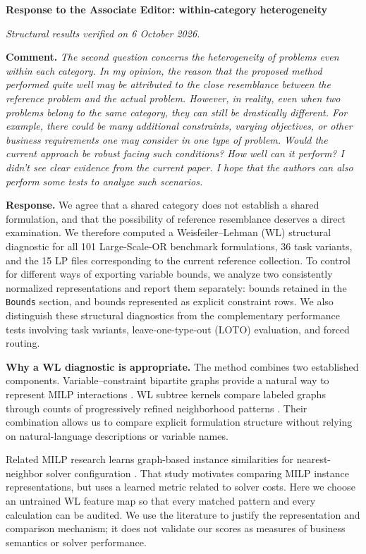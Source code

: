 \documentclass[10pt]{article}
\begin{document}
\textbf{\large Response to the Associate Editor: within-category heterogeneity}

\textit{Structural results verified on 6 October 2026.}

\textbf{Comment.} \textit{The second question concerns the heterogeneity of
problems even within each category. In my opinion, the reason that the
proposed method performed quite well may be attributed to the close
resemblance between the reference problem and the actual problem. However,
in reality, even when two problems belong to the same category, they can
still be drastically different. For example, there could be many additional
constraints, varying objectives, or other business requirements one may
consider in one type of problem. Would the current approach be robust
facing such conditions? How well can it perform? I didn't see clear evidence
from the current paper. I hope that the authors can also perform some tests
to analyze such scenarios.}

\begingroup\color{replyblue}
\textbf{Response.} We agree that a shared category does not establish a shared
formulation, and that the possibility of reference resemblance deserves a
direct examination. We therefore computed a Weisfeiler--Lehman (WL)
structural diagnostic for all 101 Large-Scale-OR benchmark formulations,
36 task variants, and the 15 LP files corresponding to the current
reference collection. To control for different ways of exporting variable
bounds, we analyze two consistently normalized representations and report
them separately: bounds retained in the \texttt{Bounds} section, and bounds
represented as explicit constraint rows. We also distinguish these
structural diagnostics from the complementary performance tests involving
task variants, leave-one-type-out (LOTO) evaluation, and forced routing.

\medskip
\textbf{Why a WL diagnostic is appropriate.}
The method combines two established components. Variable--constraint
bipartite graphs provide a natural way to represent MILP interactions
\citep{Gasse2019}. WL subtree kernels compare labeled graphs through
counts of progressively refined neighborhood patterns
\citep{Shervashidze2011}. Their combination allows us to compare explicit
formulation structure without relying on natural-language descriptions
or variable names.

Related MILP research learns graph-based instance similarities for
nearest-neighbor solver configuration \citep{Hosny2024}. That study
motivates comparing MILP instance representations, but uses a learned
metric related to solver costs. Here we choose an untrained WL feature
map so that every matched pattern and every calculation can be audited.
We use the literature to justify the representation and comparison
mechanism; it does not validate our scores as measures of business
semantics or solver performance.
\end{document}
